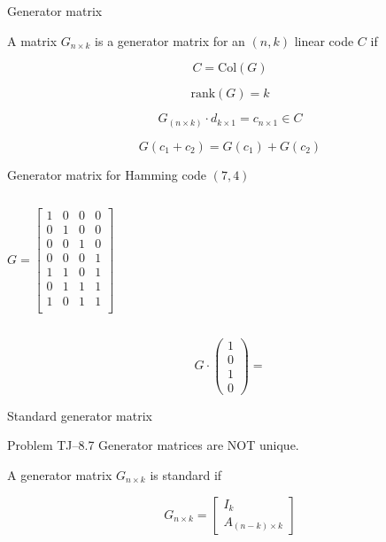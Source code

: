 \begin{frame}{Generator matrix}
  \begin{definition}
	A matrix $G_{n \times k}$ is a generator matrix for an $(n,k)$ linear code $C$ if 
	
	\[
	  C = \text{Col}(G)
	\]
  \end{definition}

  \[
	\text{rank}(G) = k
  \]

  \[
	G_{(n \times k)} \cdot d_{k \times 1} = c_{n \times 1} \in C
  \]

  \[
	G(c_1 + c_2) = G(c_1) + G(c_2)
  \]
\end{frame}
\begin{frame}{Generator matrix for Hamming code $(7,4)$}
  \begin{columns}
	  \[
		G = \begin{bmatrix}
		  1 & 0 & 0 & 0 \\
		  0 & 1 & 0 & 0 \\
		  0 & 0 & 1 & 0 \\
		  0 & 0 & 0 & 1 \\
		  1 & 1 & 0 & 1 \\
		  0 & 1 & 1 & 1 \\
		  1 & 0 & 1 & 1 \\
		\end{bmatrix}
	  \]

  \end{columns}

  \[
	G \cdot \begin{pmatrix}
	  1 \\ 0 \\ 1 \\ 0
	\end{pmatrix}
	= 
  \]
\end{frame}
\begin{frame}{Standard generator matrix}
  \begin{exampleblock}{Problem TJ--8.7}
	Generator matrices are NOT unique.
  \end{exampleblock}

  \begin{definition}
	A generator matrix $G_{n \times k}$ is standard if

	\[
	  G_{n \times k} = \begin{bmatrix}
		I_k \\ A_{(n-k) \times k}
	  \end{bmatrix}
	\]
  \end{definition}
\end{frame}
